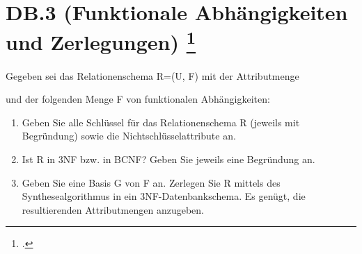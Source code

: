 \documentclass{lehramt-informatik-aufgabe}
\begin{document}
\let\FA=\liFunktionaleAbhaengigkeiten

\section{DB.3 (Funktionale Abhängigkeiten und Zerlegungen)
\footcite{examen:66116:2015:03}}

Gegeben sei das Relationenschema R=(U, F) mit der Attributmenge

\begin{center}
\end{center}

und der folgenden Menge F von funktionalen Abhängigkeiten:

\begin{center}

\FA{
  A -> B;
  A, B, C -> D;
  D -> B, C;
}
\end{center}

\begin{enumerate}


\item Geben Sie alle Schlüssel für das Relationenschema R (jeweils mit
Begründung) sowie die Nichtschlüsselattribute an.


\item Ist R in 3NF bzw. in BCNF? Geben Sie jeweils eine Begründung an.


\item Geben Sie eine Basis G von F an. Zerlegen Sie R mittels des
Synthesealgorithmus in ein 3NF-Datenbankschema. Es genügt, die
resultierenden Attributmengen anzugeben.
\end{enumerate}
\end{document}
